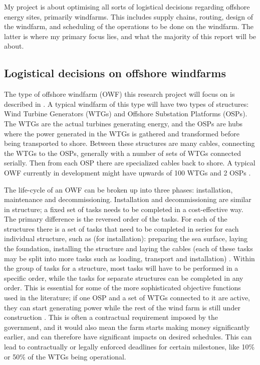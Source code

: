 \documentclass[a4paper,12pt]{article}
\begin{document}
My project is about optimising all sorts of logistical decisions regarding offshore energy sites, primarily windfarms. This includes supply chains, routing, design of the windfarm, and scheduling of the operations to be done on the windfarm. The latter is where my primary focus lies, and what the majority of this report will be about. 

\subsection{Logistical decisions on offshore windfarms} \label{ss:logdec}
The type of offshore windfarm (OWF) this research project will focus on is described in \cite{barlow2018mixed}. A typical windfarm of this type will have two types of structures: Wind Turbine Generators (WTGs) and Offshore Substation Platforms (OSPs). The WTGs are the actual turbines generating energy, and the OSPs are hubs where the power generated in the WTGs is gathered and transformed before being transported to shore. Between these structures are many cables, connecting the WTGs to the OSPs, generally with a number of sets of WTGs connected serially. Then from each OSP there are specialized cables back to shore. A typical OWF currently in development might have upwards of 100 WTGs and 2 OSPs \cite{ruk2017}. 

The life-cycle of an OWF can be broken up into three phases: installation, maintenance and decommissioning. Installation and decommissioning are similar in structure; a fixed set of tasks needs to be completed in a cost-effective way. The primary difference is the reversed order of the tasks. For each of the structures there is a set of tasks that need to be completed in series for each individual structure, such as (for installation): preparing the sea surface, laying the foundation, installing the structure and laying the cables (each of these tasks may be split into more tasks such as loading, transport and installation) \cite{kerkhove2017optimised}. Within the group of tasks for a structure, most tasks will have to be performed in a specific order, while the tasks for separate structures can be completed in any order. This is essential for some of the more sophisticated objective functions used in the literature; if one OSP and a set of WTGs connected to it are active, they can start generating power while the rest of the wind farm is still under construction \cite{barlow2017using}. This is often a contractual requirement imposed by the government, and it would also mean the farm starts making money significantly earlier, and can therefore have significant impacts on desired schedules. This can lead to contractually or legally enforced deadlines for certain milestones, like 10\% or 50\% of the WTGs being operational.
\end{document}

